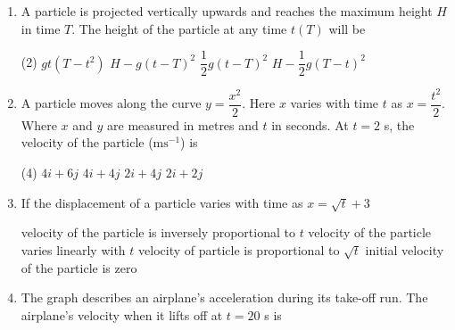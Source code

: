 \documentclass{article}
\renewcommand{\frac}[2]{\dfrac{#1}{#2}}
\begin{document}
\begin{enumerate}
    \item A particle is projected vertically upwards and reaches the maximum height \(H\) in time \(T\). The height of the particle at any time \(t (T)\) will be
    \begin{tasks}(2)
        \task \(g t (T - t^2)\)
        \task \(H - g (t - T)^2\)
        \task \(\frac{1}{2} g (t - T)^2\)
        \task \(H - \frac{1}{2} g (T - t)^2\)
    \end{tasks}

    \item A particle moves along the curve \(y = \frac{x^2}{2}\). Here \(x\) varies with time \(t\) as \(x = \frac{t^2}{2}\). Where \(x\) and \(y\) are measured in metres and \(t\) in seconds. At \(t = 2\) s, the velocity of the particle (\(\text{ms}^{-1}\)) is
    \begin{tasks}(4)
        \task \(4i + 6j\)
        \task \(4i + 4j\)
        \task \(2i + 4j\)
        \task \(2i + 2j\)
    \end{tasks}

    \item If the displacement of a particle varies with time as \(x = \sqrt{t} + 3\)
    \begin{tasks}
        \task velocity of the particle is inversely proportional to \(t\)
        \task velocity of the particle varies linearly with \(t\)
        \task velocity of particle is proportional to \(\sqrt{t}\)
        \task initial velocity of the particle is zero
    \end{tasks}

    \item The graph describes an airplane's acceleration during its take-off run. The airplane's velocity when it lifts off at \(t = 20\) s is


\end{enumerate}
\end{document}
